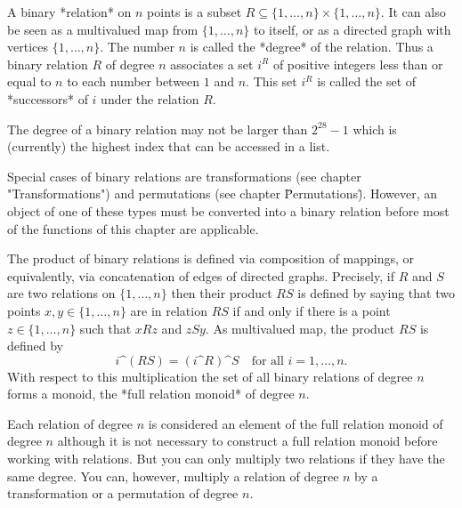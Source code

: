 %

A binary *relation* on  $n$ points is a subset  $R \subseteq  \{1, \dots,
n\}  \times \{1, \dots, n\}$.  It  can also be seen  as a multivalued map
from $\{1, \dots, n\}$  to itself, or as a  directed graph  with vertices
$\{1, \dots,  n\}$.   The  number $n$  is   called  the  *degree*  of the
relation.   Thus  a binary relation  $R$ of  degree  $n$ associates a set
$i^R$ of  positive integers  less than or  equal to   $n$ to each  number
between $1$ and $n$.  This set $i^R$ is called the set of *successors* of
$i$ under the relation $R$.

The degree of  a binary relation may  not be larger than $2^{28}-1$ which
is (currently) the highest index that can be accessed in a list.

Special  cases   of binary  relations  are  transformations  (see chapter
"Transformations")  and  permutations   (see  chapter  \"Permutations\"). 
However, an object of one of these types must be  converted into a binary
relation before most of the functions of this chapter are applicable.

The  product of binary relations is  defined via composition of mappings,
or   equivalently,   via concatenation   of edges   of   directed graphs. 
Precisely, if  $R$ and $S$  are two  relations on  $\{1, \dots, n\}$ then
their product $R S$ is defined  by saying that  two points $x, y \in \{1,
\dots, n\}$ are in relation $R S$ if and only if there is  a point $z \in
\{1, \dots, n\}$ such that $x R z$ and $z  S y$.  As multivalued map, the
product $RS$ is defined by
\[
  i\^(RS) = (i\^R)\^S \quad \mbox{for all } i = 1, \dots, n.
\]
With respect to  this multiplication the set  of all binary  relations of
degree $n$ forms a monoid, the *full relation monoid* of degree $n$.%
%

Each relation of degree $n$ is considered an element of the full relation
monoid of degree $n$  although it  is not necessary  to construct  a full
relation monoid before working with relations.  But you can only multiply
two relations if they have the same degree.  You can, however, multiply a
relation of  degree $n$ by a transformation   or a permutation  of degree
$n$.

